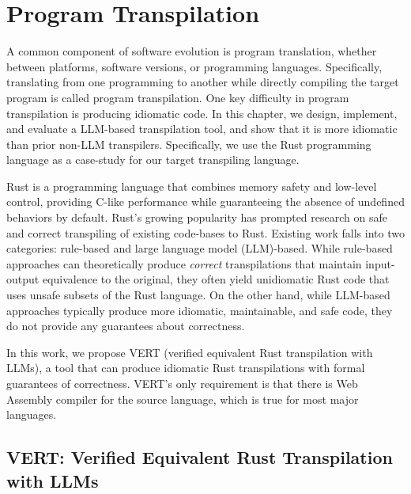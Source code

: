 \documentclass[12pt,openany,oneside,table]{cmuthesis}
\begin{document}
\chapter{Program Transpilation}
\label{ch:vert}
A common component of software evolution is program translation, whether between platforms, software versions, or programming languages. Specifically, translating from one programming to another while directly compiling the target program is called program transpilation.
One key difficulty in program transpilation is producing idiomatic code.
In this chapter, we design, implement, and evaluate a LLM-based transpilation tool, and show that it is more idiomatic than prior non-LLM transpilers. Specifically, we use the Rust programming language as a case-study for our target transpiling language.

Rust is a programming language that combines memory safety and
low-level control, providing C-like performance while guaranteeing the absence of undefined behaviors by default. Rust's growing popularity has prompted research on safe and correct transpiling of existing code-bases to Rust. Existing work falls into two categories: rule-based and large
language model (LLM)-based. While rule-based approaches can
theoretically produce \textit{correct} transpilations that maintain input-output equivalence to the original, they often yield
unidiomatic Rust code that uses unsafe subsets of
the Rust language. On the other hand, while LLM-based approaches typically produce more idiomatic, maintainable, and safe code, they do not provide any guarantees about correctness.

In this work, we propose VERT (verified equivalent Rust transpilation with LLMs), a tool that can produce idiomatic Rust transpilations with formal guarantees of correctness. VERT's only requirement is that there is Web
Assembly compiler for the source language, which is true for most major languages. 

\section{VERT: Verified Equivalent Rust Transpilation with LLMs}
\label{section:methodology}
\end{document}
